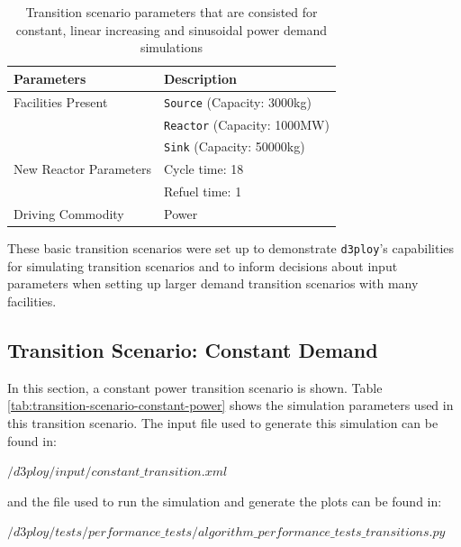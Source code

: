 \documentclass[11pt]{article}
\newcommand{\deploy}{\texttt{d3ploy}\xspace}%
\begin{document}
\begin{table}[!htb]
    \centering
    \caption {Transition scenario parameters that are consisted for constant, linear increasing and sinusoidal power demand simulations}
	\label{tab:transition-scenario-all}
        \begin{tabularx}{0.8\textwidth}{lX}
    \hline
    \textbf{Parameters}    & \textbf{Description} \\ \hline
    Facilities Present     & \texttt{Source} (Capacity: 3000kg)\\
                & \texttt{Reactor} (Capacity: 1000MW)\\
                & \texttt{Sink} (Capacity: 50000kg)      \\ 
                \hline
    New Reactor Parameters & Cycle time: 18\\
                & Refuel time: 1\\
                \hline
    Driving Commodity & Power \\ \hline
    \end{tabularx}
\end{table}

These basic transition scenarios were set up to 
demonstrate \deploy's capabilities for simulating 
transition scenarios and 
to inform decisions about input parameters when setting up larger 
demand transition scenarios with many facilities. 

\subsection{Transition Scenario: Constant Demand}

In this section, a constant power transition scenario is shown. 
Table \ref{tab:transition-scenario-constant-power} shows the 
simulation parameters used in this transition scenario.  
The input file used to generate this simulation can be found in:

\noindent
$/d3ploy/input/constant\_transition.xml$

\noindent
and the file used to run the simulation and generate the plots can be found in:

\noindent
$/d3ploy/tests/performance\_tests/algorithm\_performance\_tests\_transitions.py$
\end{document}

